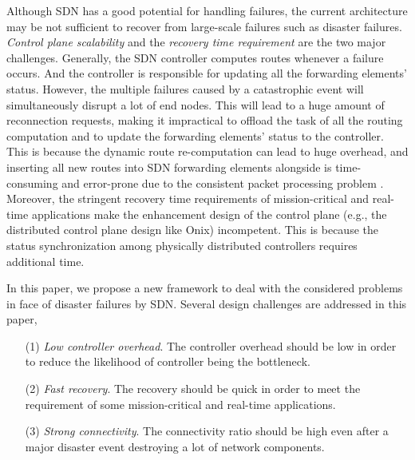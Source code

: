 \documentclass[10pt,journal]{IEEEtran}
\begin{document}
Although SDN has a good potential for handling failures, the current architecture may be not sufficient to recover from large-scale failures such as disaster failures.
\emph{Control plane scalability} and the \emph{recovery time requirement} are the two major challenges.
Generally, the SDN controller computes routes whenever a failure occurs. And the controller is responsible for updating all the forwarding elements' status. However, the multiple failures caused by a catastrophic event will simultaneously disrupt a lot of end nodes. This will lead to a huge amount of reconnection requests, making it impractical to offload the task of all the routing computation and to update the forwarding elements' status to the controller.
This is because the dynamic route re-computation can lead to huge overhead, and inserting all new routes into SDN forwarding elements alongside is time-consuming \cite{tootoonchian2012controller} and error-prone due to the consistent packet processing problem \cite{katta2013incremental,peresini2013cpp}.
Moreover, the stringent recovery time requirements of mission-critical and real-time applications \cite{liotine2003mission} make the enhancement design of the control plane (e.g., the distributed control plane design like Onix\cite{koponen2010onix}) incompetent. This is because the status synchronization among physically distributed controllers requires additional time.

In this paper, we propose a new framework to deal with the considered problems in face of disaster failures by SDN. Several design challenges are addressed in this paper,
\begin{enumerate}
\item[(1)] \emph{Low controller overhead}. The controller overhead should be low in order to reduce the likelihood of controller being the bottleneck.
\item[(2)] \emph{Fast recovery}. The recovery should be quick in order to meet the requirement of some mission-critical and real-time applications.
\item[(3)] \emph{Strong connectivity}. The connectivity ratio should be high even after a major disaster event destroying a lot of network components.
\end{enumerate}
\end{document}
